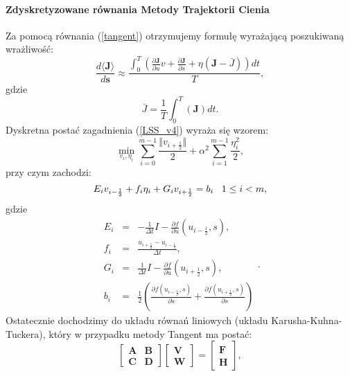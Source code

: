 \documentclass[12pt, twoside]{book}
\begin{document}
\paragraph{Zdyskretyzowane równania Metody Trajektorii Cienia}
Za pomocą równania (\ref{tangent}) otrzymujemy formułę wyrażającą poszukiwaną wrażliwość:
\begin{equation}
\frac{d\langle\textbf{J}\rangle}{d\textbf{s}} \approx \frac{\int_{0}^{T}(\frac{\partial \textbf{J}}{\partial u}v+\frac{\partial \textbf{J}}{\partial s}+\eta(\textbf{J}-\bar{J}))dt}{T}, 
\label{LSS_v5}
\end{equation}
gdzie
\begin{equation}
\bar{J} = \frac{1}{T}\int_{0}^{T}(\textbf{J})dt.
\label{LSS_v6}
\end{equation}
Dyskretna postać zagadnienia (\ref{LSS_v4}) wyraża się wzorem:
\begin{equation}
\min_{v_{i},\eta_{i}}\sum_{i=0}^{m-1}\frac{\Vert v_{i+\frac{1}{2}}\Vert}{2} + \alpha^{2}\sum_{i=1}^{m-1}\frac{\eta^{2}_{i}}{2} ,
\label{LSS_v7}
\end{equation}
przy czym zachodzi:
\begin{equation}
E_{i}v_{i-\frac{1}{2}}+f_{i}\eta_{i}+G_{i}v_{i+\frac{1}{2}} = b_{i} \thickspace \thickspace \thickspace 1\leq i < m,
\label{LSS_v8}
\end{equation}
gdzie
\begin{equation}
\begin{array}{rcl}
E_{i} &=& -\frac{1}{\Delta t}I-\frac{\partial{f}}{\partial{u}}(u_{i-\frac{1}{2}},s), \\
f_{i} &=& \frac{u_{i+\frac{1}{2}}-u_{i-\frac{1}{2}}}{\Delta t}, \\
G_{i} &=& \frac{1}{\Delta t}I-\frac{\partial{f}}{\partial{u}}(u_{i+\frac{1}{2}},s), \\ 
b_{i} &=& \frac{1}{2}(\frac{\partial{f}(u_{i-\frac{1}{2}},s)}{\partial{s}}+\frac{\partial{f}(u_{i+\frac{1}{2}},s)}{\partial{s}}) 
\end{array}.
\label{LSS_v9}
\end{equation}
Ostatecznie dochodzimy do układu równań liniowych (układu Karusha-Kuhna-Tuckera), który w przypadku metody Tangent ma postać:
\begin{equation}
\begin{bmatrix}
\textbf{A} & \textbf{B} \\
\textbf{C} & \textbf{D} 
\end{bmatrix}
\begin{bmatrix}
\textbf{V} \\
\textbf{W} 
\end{bmatrix}
= \begin{bmatrix}
\textbf{F} \\
\textbf{H} 
\end{bmatrix},
\label{LSS_v10}
\end{equation}
\end{document}
